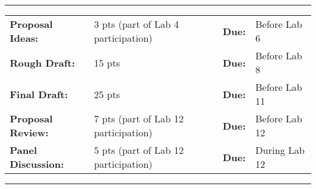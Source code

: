 \documentclass[11pt, a4paper]{article}
\begin{document}
\pagestyle{fancyplain}
\fancyhf{}
\thispagestyle{plain}

\begin{center}
\begin{singlespace}
\rule{6in}{0.4pt}
\begin{tabular}{llll}
\textbf{Proposal Ideas:} & 3 pts (part of Lab 4 participation) & \textbf{Due:} & Before Lab 6 \\
\textbf{Rough Draft:} & 15 pts & \textbf{Due:} & Before Lab 8 \\
\textbf{Final Draft:} & 25 pts & \textbf{Due:} & Before Lab 11 \\
\textbf{Proposal Review:} & 7 pts (part of Lab 12 participation) & \textbf{Due:} & Before Lab 12 \\
\textbf{Panel Discussion:} & 5 pts (part of Lab 12 participation) & \textbf{Due:} & During Lab 12 \\
\end{tabular}
\rule{6in}{0.4pt}
\end{singlespace}
\end{center}
\vspace{.5cm}
\setlength{\unitlength}{1in}
\renewcommand{\arraystretch}{2}
\end{document}
